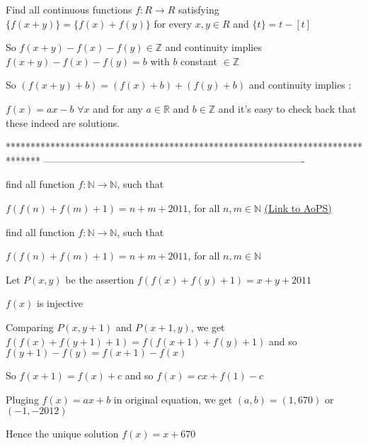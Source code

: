 \begin{solution}
	\begin{tcolorbox}Find all continuous functions $f: R \rightarrow R $ satisfying $\{f(x+y)\}=\{f(x)+f(y)\}$ for every $x,y \in R$ and 
$\{t\}=t-[t]$\end{tcolorbox}
So $f(x+y)-f(x)-f(y)\in\mathbb Z$ and continuity implies $f(x+y)-f(x)-f(y)=b$ with $b$ constant $\in\mathbb Z$

So $(f(x+y)+b)=(f(x)+b)+(f(y)+b)$ and continuity implies :

$\boxed{f(x)=ax-b}$ $\forall x$ and for any $a\in\mathbb R$ and $b\in\mathbb Z$ and it's easy to check back that these indeed are solutions.
\end{solution}
*******************************************************************************
-------------------------------------------------------------------------------

\begin{problem}
	find all function $f : \mathbb{N} \rightarrow \mathbb{N}$, such that

$f(f(n) + f(m) + 1) = n + m + 2011$, for all $n, m \in \mathbb{N}$
	\flushright \href{https://artofproblemsolving.com/community/c6h484624}{(Link to AoPS)}
\end{problem}



\begin{solution}
	\begin{tcolorbox}find all function $f : \mathbb{N} \rightarrow \mathbb{N}$, such that

$f(f(n) + f(m) + 1) = n + m + 2011$, for all $n, m \in \mathbb{N}$\end{tcolorbox}
Let $P(x,y)$ be the assertion $f(f(x)+f(y)+1)=x+y+2011$

$f(x)$ is injective

Comparing $P(x,y+1)$ and $P(x+1,y)$, we get $f(f(x)+f(y+1)+1)=f(f(x+1)+f(y)+1)$ and so $f(y+1)-f(y)=f(x+1)-f(x)$

So $f(x+1)=f(x)+c$ and so $f(x)=cx+f(1)-c$

Pluging $f(x)=ax+b$ in original equation, we get $(a,b)=(1,670)$ or $(-1,-2012)$

Hence the unique solution $\boxed{f(x)=x+670}$
\end{solution}



